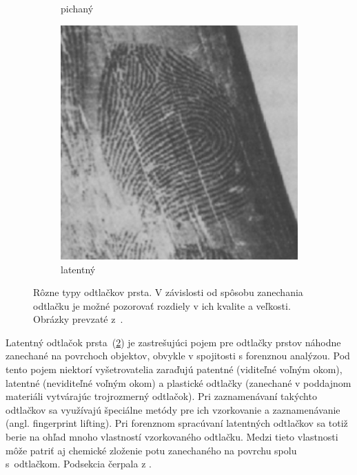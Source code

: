 \begin{figure}[h]
\begin{subfigure}[b]{0.32\linewidth}
      \caption{pichaný}
      \label{obr:pichany_odtlacok}
    \end{subfigure}
    \hfill
    \begin{subfigure}[b]{0.32\linewidth}
      \includegraphics[width=\linewidth]{obrazky-figures/latentny_odtlacok-Drahansky.png}
      \caption{latentný}
      \label{obr:latentny_odtlacok}
    \end{subfigure}
    \caption{Rôzne typy odtlačkov prsta. V závislosti od spôsobu zanechania odtlačku je možné pozorovať rozdiely v ich kvalite a veľkosti.
            Obrázky prevzaté z~{\cite{Drahansky}}.}
    \label{obr:druhy_odtlackov}
  \end{figure}
  
  Latentný odtlačok prsta~(\ref{obr:latentny_odtlacok}) je zastrešujúci pojem pre odtlačky prstov náhodne zanechané na povrchoch objektov, obvykle v spojitosti
  s forenznou analýzou. Pod tento pojem niektorí vyšetrovatelia zaraďujú patentné (viditeľné voľným okom), latentné (neviditeľné voľným okom) a plastické odtlačky
  (zanechané v poddajnom materiáli vytvárajúc trojrozmerný odtlačok). Pri zaznamenávaní takýchto odtlačkov sa využívajú špeciálne metódy pre ich vzorkovanie
  a zaznamenávanie (angl. fingerprint lifting).
  Pri forenznom spracúvaní latentných odtlačkov sa totiž berie na ohľad mnoho vlastností vzorkovaného odtlačku. Medzi tieto vlastnosti môže patriť aj
  chemické zloženie potu zanechaného na povrchu spolu s~odtlačkom. Podsekcia čerpala z \cite{FingerprintSrcBook}.

